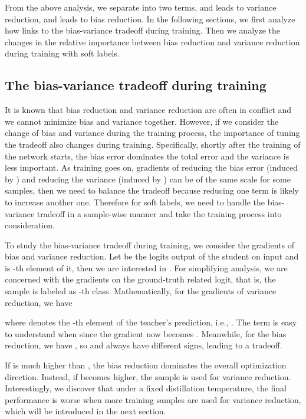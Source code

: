\documentclass{article} \usepackage{iclr2021_conference,times}
\begin{document}
From the above analysis, we separate  into two terms, and  leads to variance reduction, and  leads to bias reduction.
In the following sections, we first analyze how  links to the bias-variance tradeoff during training. 
Then we analyze the changes in the relative importance between bias reduction and variance reduction during training with soft labels. 


\subsection{The bias-variance tradeoff during training}
\label{sec:intuitive}
It is known that bias reduction and variance reduction are often in conflict and we cannot minimize bias and variance together. 
However, if we consider the change of bias and variance during the training process, the importance of tuning the tradeoff also changes during training.
Specifically, shortly after the training of the network starts, the bias error dominates the total error and the variance is less important.
As training goes on, gradients of reducing the bias error (induced by ) and reducing the variance (induced by ) can be of the same scale for some samples, then we need to balance the tradeoff because reducing one term is likely to increase another one.
Therefore for soft labels, we need to handle the bias-variance tradeoff in a sample-wise manner and take the training process into consideration.

To study the bias-variance tradeoff during training, we consider the gradients of bias and variance reduction.
Let  be the logits output of the student on input  and  is -th element of it, then we are interested in . 
For simplifying analysis, we are concerned with the gradients on the ground-truth related logit, that is, the sample  is labeled as -th class.
Mathematically, for the gradients of variance reduction, we have 

where  denotes the -th element of the teacher's prediction, i.e., . The term  is easy to understand when  since the gradient now becomes . Meanwhile, for the bias reduction, we have , so  and  always have different signs, leading to a tradeoff.

If  is much higher than , the bias reduction dominates the overall optimization direction. Instead, if  becomes higher, the sample is used for variance reduction.
Interestingly, we discover that under a fixed distillation temperature, the final performance is worse when more training samples are used for variance reduction, which will be introduced in the next section. 
\end{document}
